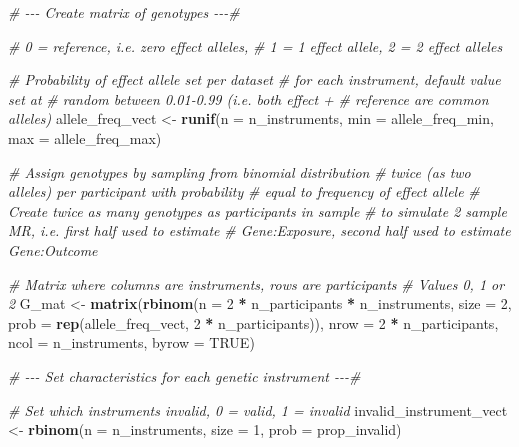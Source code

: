 \documentclass[
]{article}
\newenvironment{Shaded}{\begin{snugshade}}{\end{snugshade}}
\newcommand{\AttributeTok}[1]{\textcolor[rgb]{0.13,0.29,0.53}{#1}}
\newcommand{\CommentTok}[1]{\textcolor[rgb]{0.56,0.35,0.01}{\textit{#1}}}
\newcommand{\ConstantTok}[1]{\textcolor[rgb]{0.56,0.35,0.01}{#1}}
\newcommand{\DecValTok}[1]{\textcolor[rgb]{0.00,0.00,0.81}{#1}}
\newcommand{\FunctionTok}[1]{\textcolor[rgb]{0.13,0.29,0.53}{\textbf{#1}}}
\newcommand{\NormalTok}[1]{#1}
\newcommand{\OtherTok}[1]{\textcolor[rgb]{0.56,0.35,0.01}{#1}}
\newcommand{\SpecialCharTok}[1]{\textcolor[rgb]{0.81,0.36,0.00}{\textbf{#1}}}
\begin{document}
\begin{Shaded}
\begin{Highlighting}[]
    \CommentTok{\# {-}{-}{-} Create matrix of genotypes {-}{-}{-}\#}

    \CommentTok{\# 0 = reference, i.e. zero effect alleles,}
    \CommentTok{\# 1 = 1 effect allele, 2 = 2 effect alleles}

    \CommentTok{\# Probability of effect allele set per dataset}
    \CommentTok{\# for each instrument, default value set at}
    \CommentTok{\# random between 0.01{-}0.99 (i.e. both effect +}
    \CommentTok{\# reference are common alleles)}
\NormalTok{     allele\_freq\_vect }\OtherTok{\textless{}{-}} \FunctionTok{runif}\NormalTok{(}\AttributeTok{n =}\NormalTok{ n\_instruments,}
                               \AttributeTok{min =}\NormalTok{ allele\_freq\_min,}
                               \AttributeTok{max =}\NormalTok{ allele\_freq\_max)}

    \CommentTok{\# Assign genotypes by sampling from binomial distribution}
    \CommentTok{\# twice (as two alleles) per participant with probability}
    \CommentTok{\# equal to frequency of effect allele}
    \CommentTok{\# Create twice as many genotypes as participants in sample}
    \CommentTok{\# to simulate 2 sample MR, i.e. first half used to estimate}
    \CommentTok{\# Gene:Exposure, second half used to estimate Gene:Outcome}

    \CommentTok{\# Matrix where columns are instruments, rows are participants}
    \CommentTok{\# Values 0, 1 or 2}
\NormalTok{     G\_mat }\OtherTok{\textless{}{-}} \FunctionTok{matrix}\NormalTok{(}\FunctionTok{rbinom}\NormalTok{(}\AttributeTok{n =} \DecValTok{2} \SpecialCharTok{*}\NormalTok{ n\_participants }\SpecialCharTok{*}\NormalTok{ n\_instruments,}
                            \AttributeTok{size =} \DecValTok{2}\NormalTok{,}
                            \AttributeTok{prob =} \FunctionTok{rep}\NormalTok{(allele\_freq\_vect, }\DecValTok{2} \SpecialCharTok{*}\NormalTok{ n\_participants)),}
                     \AttributeTok{nrow =} \DecValTok{2} \SpecialCharTok{*}\NormalTok{ n\_participants,}
                     \AttributeTok{ncol =}\NormalTok{ n\_instruments,}
                     \AttributeTok{byrow =} \ConstantTok{TRUE}\NormalTok{)}

    \CommentTok{\# {-}{-}{-} Set characteristics for each genetic instrument {-}{-}{-}\#}

    \CommentTok{\# Set which instruments invalid, 0 = valid, 1 = invalid}
\NormalTok{     invalid\_instrument\_vect }\OtherTok{\textless{}{-}} \FunctionTok{rbinom}\NormalTok{(}\AttributeTok{n =}\NormalTok{ n\_instruments,}
                                       \AttributeTok{size =} \DecValTok{1}\NormalTok{,}
                                       \AttributeTok{prob =}\NormalTok{ prop\_invalid)}


\end{Highlighting}
\end{Shaded}
\end{document}
